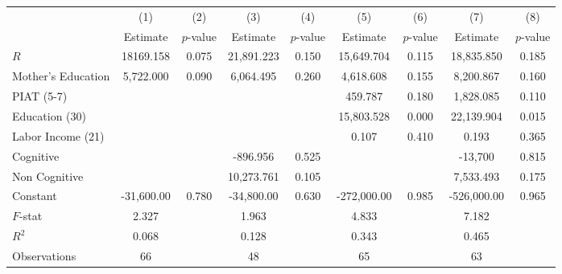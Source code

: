 \begin{tabular}{lcccccccc} \toprule
 & (1) & (2) & (3) & (4) & (5) & (6) & (7) & (8) \\ 
 & Estimate  & $p$-value  & Estimate  & $p$-value  & Estimate  & $p$-value  & Estimate  & $p$-value  \\  \midrule
$R$ & 18169.158 &     0.075 & 21,891.223 &     0.150 & 15,649.704 &     0.115 & 18,835.850 &     0.185 \\  
Mother's Education &  5,722.000 &     0.090 &  6,064.495 &     0.260 &  4,618.608 &     0.155 &  8,200.867 &     0.160 \\  
PIAT (5-7) &         &         &         &         &   459.787 &     0.180 &  1,828.085 &     0.110 \\  
Education (30) &         &         &         &         & 15,803.528 &     0.000 & 22,139.904 &     0.015 \\  
Labor Income (21) &         &         &         &         &     0.107 &     0.410 &     0.193 &     0.365 \\  
Cognitive &         &         &  -896.956 &     0.525 &         &         & -13,700 &     0.815 \\  
Non Cognitive &         &         & 10,273.761 &     0.105 &         &         &  7,533.493 &     0.175 \\  
Constant & -31,600.00 &     0.780 & -34,800.00 &     0.630 & -272,000.00 &     0.985 & -526,000.00 &     0.965 \\  \midrule
$F$-stat &     2.327 &         &     1.963 &         &     4.833 &         &     7.182 &         \\  \midrule 
$R^2$ &     0.068 &         &     0.128 &         &     0.343 &         &     0.465 &         \\  
Observations &    66 &         &    48 &         &    65 &         &    63 &         \\  
\bottomrule \end{tabular}
